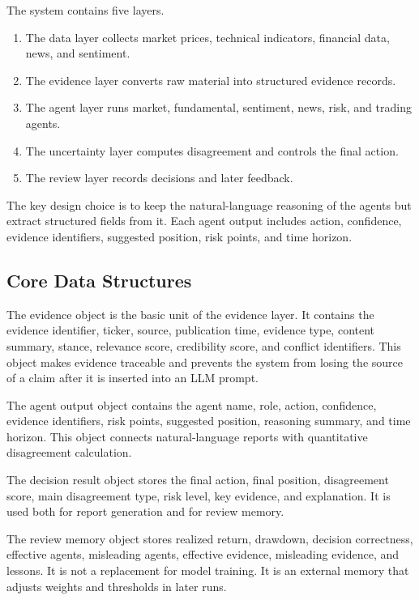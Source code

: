 \documentclass[14pt,a4paper]{extarticle}
\begin{document}
The system contains five layers.

\begin{enumerate}[label=\arabic*)]
  \item The data layer collects market prices, technical indicators, financial data, news, and sentiment.
  \item The evidence layer converts raw material into structured evidence records.
  \item The agent layer runs market, fundamental, sentiment, news, risk, and trading agents.
  \item The uncertainty layer computes disagreement and controls the final action.
  \item The review layer records decisions and later feedback.
\end{enumerate}

The key design choice is to keep the natural-language reasoning of the agents but extract structured fields from it. Each agent output includes action, confidence, evidence identifiers, suggested position, risk points, and time horizon.

\subsection{Core Data Structures}

The evidence object is the basic unit of the evidence layer. It contains the evidence identifier, ticker, source, publication time, evidence type, content summary, stance, relevance score, credibility score, and conflict identifiers. This object makes evidence traceable and prevents the system from losing the source of a claim after it is inserted into an LLM prompt.

The agent output object contains the agent name, role, action, confidence, evidence identifiers, risk points, suggested position, reasoning summary, and time horizon. This object connects natural-language reports with quantitative disagreement calculation.

The decision result object stores the final action, final position, disagreement score, main disagreement type, risk level, key evidence, and explanation. It is used both for report generation and for review memory.

The review memory object stores realized return, drawdown, decision correctness, effective agents, misleading agents, effective evidence, misleading evidence, and lessons. It is not a replacement for model training. It is an external memory that adjusts weights and thresholds in later runs.
\end{document}
